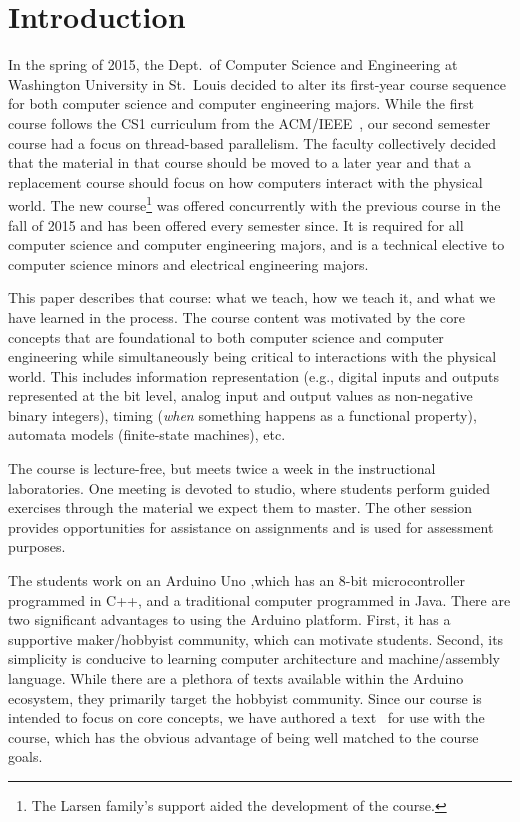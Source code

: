 \section{Introduction}
\label{sec:intro}

In the spring of 2015, the Dept.~of Computer Science and Engineering at
Washington University in St.~Louis decided to alter
its first-year course sequence for both computer science and
computer engineering majors.  While the first course follows
the CS1 curriculum from the ACM/IEEE~\cite{cs13}, our second semester
course had a focus on thread-based parallelism.  The faculty
 collectively decided that the material in that course should be moved
to a later year and that a replacement course should focus on
how computers interact with the physical world.
The new course\footnote{The Larsen family's support aided the development of the course.} was offered concurrently with the previous course in the
fall of 2015 and has been offered every semester since.
It is required for all computer science and computer engineering majors,
and is a technical elective to computer science minors and electrical
engineering majors.

This paper describes that course: what we teach, how we teach it, and
what we have learned in the process.  The course content was motivated by the core concepts that are foundational to both computer science and computer engineering while simultaneously being critical to interactions with the physical world.
This includes information representation (e.g., digital inputs
and outputs represented at the bit level, analog input and output values as
non-negative binary integers),
timing (\emph{when} something happens as a functional property),
automata models (finite-state machines), etc.

The course is lecture-free, but meets twice a week in the
instructional laboratories.  One meeting is devoted to studio, where students perform guided exercises through the material we
expect them to master. The other session provides opportunities for assistance on assignments and is used for assessment purposes.

The students work on an Arduino Uno %
,which has an 8-bit microcontroller programmed in C++,
and a traditional computer programmed in Java.
There are two significant advantages to using the Arduino platform.
First, it has a supportive maker/hobbyist community, which can motivate students.
Second, its simplicity is conducive to
learning computer architecture and machine/assembly language.
While there are a plethora of texts available within the Arduino
ecosystem, they primarily target the hobbyist community. Since
our course is intended to focus on core concepts, we have authored
a text~\cite{cc17} for use with the course, which has the obvious
advantage of being well matched to the course goals.


